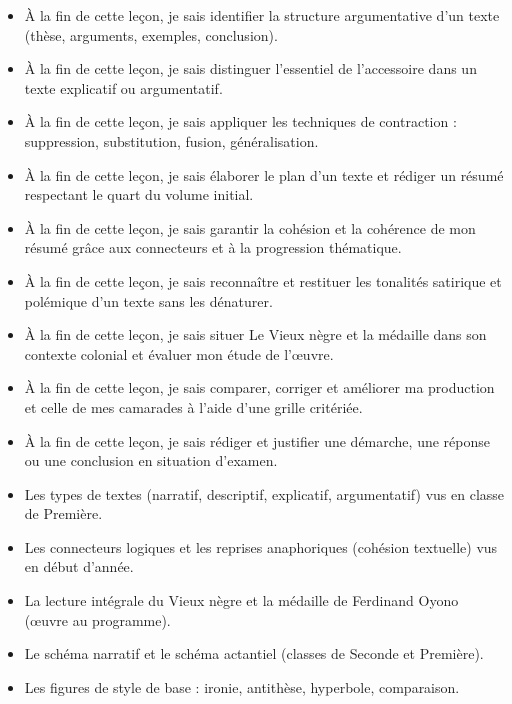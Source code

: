 \documentclass[11pt]{article}
\begin{document}
\begin{objectifs}
\begin{itemize}
\item À la fin de cette leçon, je sais identifier la structure argumentative d'un texte (thèse, arguments, exemples, conclusion).
\item À la fin de cette leçon, je sais distinguer l'essentiel de l'accessoire dans un texte explicatif ou argumentatif.
\item À la fin de cette leçon, je sais appliquer les techniques de contraction : suppression, substitution, fusion, généralisation.
\item À la fin de cette leçon, je sais élaborer le plan d'un texte et rédiger un résumé respectant le quart du volume initial.
\item À la fin de cette leçon, je sais garantir la cohésion et la cohérence de mon résumé grâce aux connecteurs et à la progression thématique.
\item À la fin de cette leçon, je sais reconnaître et restituer les tonalités satirique et polémique d'un texte sans les dénaturer.
\item À la fin de cette leçon, je sais situer Le Vieux nègre et la médaille dans son contexte colonial et évaluer mon étude de l'œuvre.
\item À la fin de cette leçon, je sais comparer, corriger et améliorer ma production et celle de mes camarades à l'aide d'une grille critériée.
\item À la fin de cette leçon, je sais rédiger et justifier une démarche, une réponse ou une conclusion en situation d'examen.
\end{itemize}
\end{objectifs}

\begin{prerequis}
\begin{itemize}
\item Les types de textes (narratif, descriptif, explicatif, argumentatif) vus en classe de Première.
\item Les connecteurs logiques et les reprises anaphoriques (cohésion textuelle) vus en début d'année.
\item La lecture intégrale du Vieux nègre et la médaille de Ferdinand Oyono (œuvre au programme).
\item Le schéma narratif et le schéma actantiel (classes de Seconde et Première).
\item Les figures de style de base : ironie, antithèse, hyperbole, comparaison.
\end{itemize}
\end{prerequis}
\end{document}
